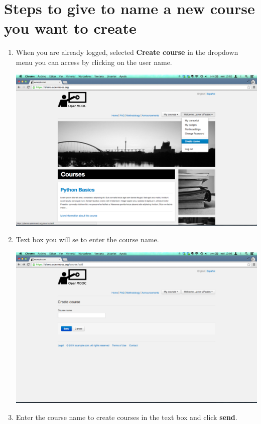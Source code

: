 \documentclass[letterpaper,10pt,english]{sphinxmanual}
\begin{document}
\section{Steps to give to name a new course you want to create}
\label{naming_the_course:steps-to-give-to-name-a-new-course-you-want-to-create}\begin{enumerate}
\item {} 
When you are already logged, selected \textbf{Create course} in the dropdown menu you can access by clicking on the user name.

\includegraphics{1_create_course-1.png}

\item {} 
Text box you will se to enter the course name.

\includegraphics{2_create_course-2.png}

\item {} 
Enter the course name to create courses in the text box and click \textbf{send}.


\end{enumerate}
\end{document}
